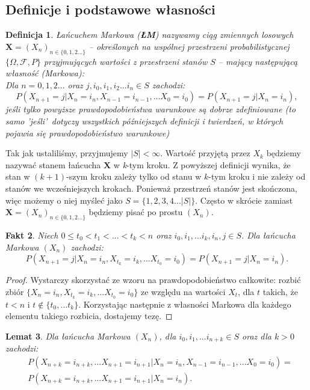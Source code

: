\documentclass[a4paper]{article}
\theoremstyle{defn}
\newtheorem{defn}{Definicja}[subsection]
\theoremstyle{theorem}
\theoremstyle{lemma}
\newtheorem{lemma}[defn]{Lemat}
\theoremstyle{cor}
\theoremstyle{fact}
\newtheorem{fact}[defn]{Fakt}
\begin{document}
\subsection{Definicje i podstawowe własności}
\label{sect2.1}
\begin{defn}\label{defn2.1.1}
\textit{Łańcuchem Markowa} (\textbf{ŁM}) nazywamy ciąg zmiennych losowych $\boldsymbol{X} = (X_n)_{n \in \{0,1,2...\}}$ – określonych na wspólnej przestrzeni probabilistycznej $\{\Omega, \mathcal{F}, P\}$ przyjmujących wartości z przestrzeni stanów $S$ – mający następującą własność (Markowa):\\
Dla $n = 0, 1, 2...$ oraz $j, i_0, i_1, i_2 ... i_n \in S$ zachodzi: $$P(X_{n+1} = j | X_n = i_n, X_{n-1} = i_{n-1}, ... X_0 = i_0) = P(X_{n+1} = j| X_{n} = i_n),$$
jeśli tylko powyższe prawdopodobieństwa warunkowe są dobrze zdefiniowane (to samo 'jeśli'\, dotyczy wszystkich późniejszych definicji i twierdzeń, w których pojawia się prawdopodobieństwo warunkowe)
\end{defn}
Tak jak ustaliliśmy, przyjmujemy $|S| <\infty$. Wartość przyjętą przez $X_k$ będziemy nazywać stanem łańcucha $\boldsymbol{X}$ w \textit{k}-tym kroku. Z powyższej definicji wynika, że stan w $(k+1)$-szym kroku zależy tylko od stanu w $k$-tym kroku i nie zależy od stanów we wcześniejszych krokach. Ponieważ przestrzeń stanów jest skończona, więc możemy o niej myśleć jako $S = \{1,2,3,4...|S|\}$. Często w skrócie zamiast $\boldsymbol{X} = (X_n)_{n \in \{0,1,2...\}}$ będziemy pisać po prostu $(X_n)$.
\begin{fact}\label{fact2.1.2}
Niech $0 \leq t_0 < t_1 < ... < t_k < n$ oraz $i_0, i_1, ... i_k, i_n, j \in S$. Dla łańcucha Markowa $(X_n)$ zachodzi:
$$P(X_{n+1} = j | X_n = i_n, X_{t_{k}} = i_k, ... X_{t_0} = i_0) = P(X_{n+1} = j| X_{n} = i_n).$$
\end{fact}
\begin{proof}
Wystarczy skorzystać ze wzoru na prawdopodobieństwo całkowite: rozbić zbiór $\{X_n = i_n, X_{t_{k}} = i_k, ... X_{t_0} = i_0\}$ ze względu na wartości $X_t$, dla $t$ takich, że $t < n$ i $t \notin \{t_0, ... t_k\}$. Korzystając następnie z własności Markowa dla każdego elementu takiego rozbicia, dostajemy tezę.
\end{proof}
\begin{lemma}\label{lemma2.1.3}
Dla łańcucha Markowa $(X_n)$, dla $i_0, i_1, ... i_{n+k} \in S$ oraz dla $k > 0$ zachodzi:
\begin{align*}
&P(X_{n+k} = i_{n+k}, ...X_{n+1} = i_{n+1} | X_n = i_n, X_{n-1} = i_{n-1}, ... X_0 = i_0)=\\
&P(X_{n+k} = i_{n+k}, ...X_{n+1} = i_{n+1} | X_n = i_n).
\end{align*}
\end{lemma}
\end{document}
